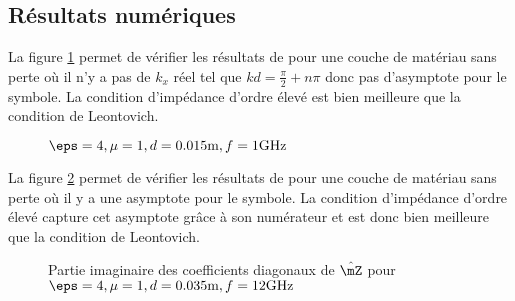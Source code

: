   \subsection{Résultats numériques}

      La figure \ref{fig:imp_fourier:plan:hoppe:33:hoibc} permet de vérifier les résultats de \cite[p.~33]{hoppe_impedance_1995} pour une couche de matériau sans perte où il n'y a pas de \(k_x\) réel tel que \(kd=\frac{\pi}{2} + n \pi\) donc pas d'asymptote pour le symbole. La condition d'impédance d'ordre élevé est bien meilleure que la condition de Leontovich.
      \begin{figure}[!hbt]
          \centering
          
          \caption[CIOE sur empilement de Hoppe & Rahmat-Samii p.~33]{\(\eps = 4, \mu = 1, d=0.015\text{m}, f=1\text{GHz}\)}
          \label{fig:imp_fourier:plan:hoppe:33:hoibc}
      \end{figure}
      \begin{table}[!hbt]
        \centering
        \caption{Coefficients associés à la figure \ref{fig:imp_fourier:plan:hoppe:33:hoibc}}
        \label{tab:imp_fourier:plan:hoppe:33:hoibc}
      \end{table}

      La figure \ref{fig:imp_fourier:plan:soudais:hoibc} permet de vérifier les résultats de \cite[p.~11]{soudais_3d_2017} pour une couche de matériau sans perte où il y a une asymptote pour le symbole. La condition d'impédance d'ordre élevé capture cet asymptote grâce à son numérateur et est donc bien meilleure que la condition de Leontovich.
      \begin{figure}[!hbt]
          \centering
          
          \caption[CIOE sur empilement de P.~Soudais p.~11]{Partie imaginaire des coefficients diagonaux de \(\hat\mZ\) pour \(\eps = 4, \mu = 1, d=0.035\text{m}, f=12\text{GHz}\)}
          \label{fig:imp_fourier:plan:soudais:hoibc}
      \end{figure}
      \begin{table}[!hbt]
        \centering
        \caption{Coefficients associés à la figure \ref{fig:imp_fourier:plan:soudais:hoibc}}
        \label{tab:imp_fourier:plan:soudais:hoibc}
      \end{table}

